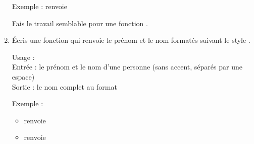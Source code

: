 \documentclass[11pt,class=report,crop=false]{standalone}
\begin{document}
\begin{activite}
\begin{enumerate}
\begin{fonction}[\ci{majuscules()}]
  \medskip
     
   Exemple :  renvoie 
  \end{fonction} 
   
   Fais le travail semblable pour une fonction .
  
   \item Écris une fonction  qui renvoie le prénom et le nom formatés suivant le style .
   
   
  \begin{fonction}
  Usage : \\
   Entrée : le prénom et le nom d'une personne (sans accent, séparés par une espace)\\
   Sortie : le nom complet au format 
  
  \medskip
     
   Exemple :
   \begin{itemize}  
    \item {} renvoie 
    \item {} renvoie 
  \end{itemize} 
  \end{fonction}    
    
\end{enumerate}
\end{activite}


\end{document}
